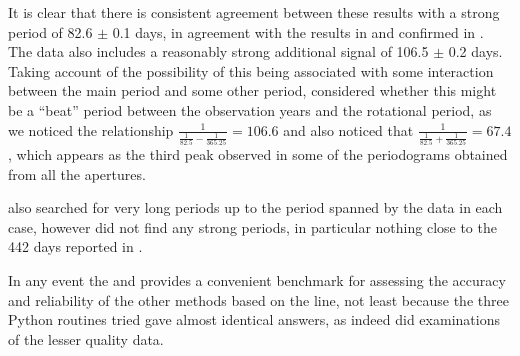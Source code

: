 It is clear that there is consistent agreement between these results with a strong period of 82.6 $\pm$ 0.1 days, in
agreement with the results in \citet{benedict98} and confirmed in \citet{kiraga07}.  The {\asas} data also includes a
reasonably strong additional signal of 106.5 $\pm$ 0.2 days. Taking account of the possibility of this being associated
with some interaction between the main period and some other
period, %
{\Firstp} considered whether this might be a ``beat'' period between the observation years and the rotational period, as
we noticed the relationship $ \frac{1}{\frac{1}{82.5} - \frac{1}{365.25}} = 106.6 $ and {\Firstp} also noticed that $
\frac{1}{\frac{1}{82.5} + \frac{1}{365.25}} = 67.4 $, which appears as the third peak observed in some of the
periodograms obtained from all the {\asas} apertures.

{\FirstP} also searched for very long periods up to the period spanned by the data in each case, however {\Firstp} did
not find any strong periods, in particular nothing close to the 442 days reported in \citet{cincunegui07}.

In any event the {\asas} and {\hst} provides a convenient benchmark for assessing the accuracy and reliability of the
other methods based on the {\ha} line, not least because the three Python routines tried gave almost identical answers,
as indeed did examinations of the lesser quality {\asas} data.
